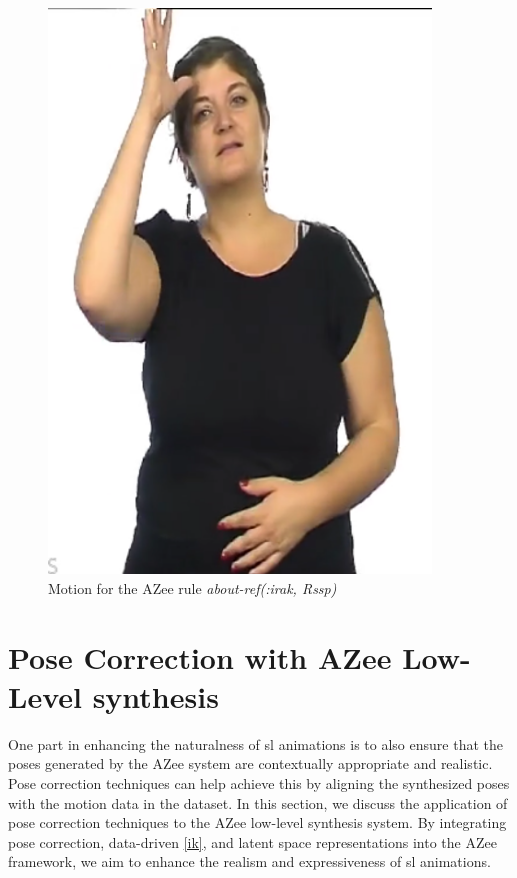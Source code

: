\documentclass[../../main.tex]{subfiles}
\begin{document}
\begin{figure}
    \centering \includegraphics[width = 4in]{chapters/intermediate_blocks_pose_correction/images/about_ref_irak.png}
    \caption{Motion for the AZee rule \emph{about-ref(:irak, Rssp)}}
    \label{fig:about_ref_irak}
\end{figure}

\section{Pose Correction with AZee Low-Level synthesis}
\label{ch:pose_correction:pose_correction_with_azee}

One part in enhancing the naturalness of \gls{sl} animations is to also ensure that the poses generated by the AZee system are contextually appropriate and realistic. Pose correction techniques can help achieve this by aligning the synthesized poses with the motion data in the dataset. In this section, we discuss the application of pose correction techniques to the AZee low-level synthesis system. By integrating pose correction, data-driven \ref{ik}, and latent space representations into the AZee framework, we aim to enhance the realism and expressiveness of \gls{sl} animations.
\end{document}
